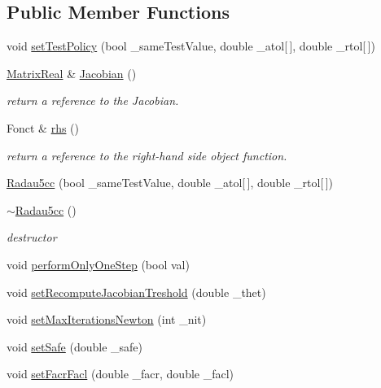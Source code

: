 \subsection*{Public Member Functions}
\begin{DoxyCompactItemize}
\item 
void \hyperlink{classodes_1_1Radau5cc_a94bc8707bc5faac1fb8516d044f9f061}{set\+Test\+Policy} (bool \+\_\+same\+Test\+Value, double \+\_\+atol\mbox{[}$\,$\mbox{]}, double \+\_\+rtol\mbox{[}$\,$\mbox{]})
\item 
\hyperlink{classodes_1_1Radau5cc_a8ef067b8852403d48d8528f601a4626a}{Matrix\+Real} \& \hyperlink{classodes_1_1Radau5cc_a68e870fccb45ca4568665a34d0bb1aa8}{Jacobian} ()
\begin{DoxyCompactList}\small\item\em return a reference to the Jacobian. \end{DoxyCompactList}\item 
Fonct \& \hyperlink{classodes_1_1Radau5cc_a761efc49340f89b5148350ce5e76fb64}{rhs} ()
\begin{DoxyCompactList}\small\item\em return a reference to the right-\/hand side object function. \end{DoxyCompactList}\item 
\hyperlink{classodes_1_1Radau5cc_a87750274a7c162114b18a45cd8da0b52}{Radau5cc} (bool \+\_\+same\+Test\+Value, double \+\_\+atol\mbox{[}$\,$\mbox{]}, double \+\_\+rtol\mbox{[}$\,$\mbox{]})
\item 
\hyperlink{classodes_1_1Radau5cc_adcb8d2836087285468b23e675645592c}{$\sim$\+Radau5cc} ()
\begin{DoxyCompactList}\small\item\em destructor \end{DoxyCompactList}\item 
void \hyperlink{classodes_1_1Radau5cc_a982fb7b6b00c6fd760c49fd36d9a4750}{perform\+Only\+One\+Step} (bool val)
\item 
void \hyperlink{classodes_1_1Radau5cc_a6ded95131d3d3475848df0db823eddcf}{set\+Recompute\+Jacobian\+Treshold} (double \+\_\+thet)
\item 
void \hyperlink{classodes_1_1Radau5cc_a3ba97342c5095591820ee7e085ac72a2}{set\+Max\+Iterations\+Newton} (int \+\_\+nit)
\item 
void \hyperlink{classodes_1_1Radau5cc_a0a606af9c7bf97f1c8b0f8f3aa9d7fb1}{set\+Safe} (double \+\_\+safe)
\item 
void \hyperlink{classodes_1_1Radau5cc_ae688f9f0edc04e3c0c2a670d62b51837}{set\+Facr\+Facl} (double \+\_\+facr, double \+\_\+facl)

\end{DoxyCompactItemize}
